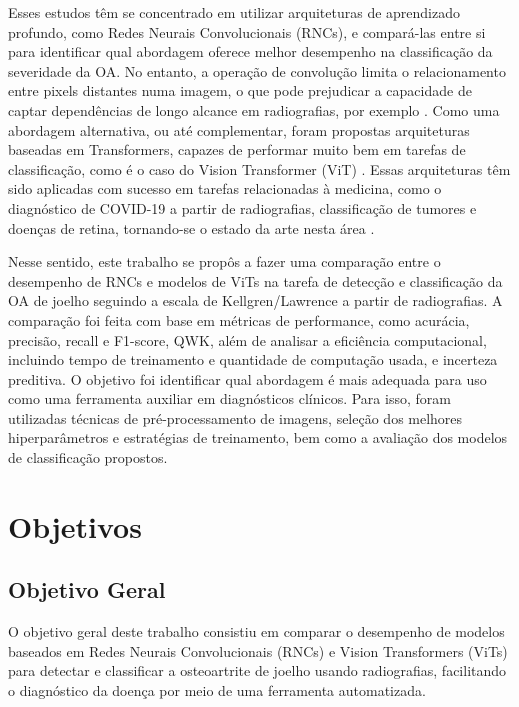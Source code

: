 Esses estudos têm se concentrado em utilizar arquiteturas de aprendizado profundo, como Redes Neurais Convolucionais (RNCs), e compará-las entre si para identificar qual abordagem oferece melhor desempenho na classificação da severidade da OA. No entanto, a operação de convolução limita o relacionamento entre pixels distantes numa imagem, o que pode prejudicar a capacidade de captar dependências de longo alcance em radiografias, por exemplo \citep{Shamshad2023}. Como uma abordagem alternativa, ou até complementar, foram propostas arquiteturas baseadas em Transformers, capazes de performar muito bem em tarefas de classificação, como é o caso do Vision Transformer (ViT) \citep{Dosovitskiy2021}. Essas arquiteturas têm sido aplicadas com sucesso em tarefas relacionadas à medicina, como o diagnóstico de COVID-19 a partir de radiografias, classificação de tumores e doenças de retina, tornando-se o estado da arte nesta área \citep{Shamshad2023}.

Nesse sentido, este trabalho se propôs a fazer uma comparação entre o desempenho de RNCs e modelos de ViTs na tarefa de detecção e classificação da OA de joelho seguindo a escala de Kellgren/Lawrence a partir de radiografias. A comparação foi feita com base em métricas de performance, como acurácia, precisão, recall e F1-score, QWK, além de analisar a eficiência computacional, incluindo tempo de treinamento e quantidade de computação usada, e incerteza preditiva. O objetivo foi identificar qual abordagem é mais adequada para uso como uma ferramenta auxiliar em diagnósticos clínicos. Para isso, foram utilizadas técnicas de pré-processamento de imagens, seleção dos melhores hiperparâmetros e estratégias de treinamento, bem como a avaliação dos modelos de classificação propostos.

\section{Objetivos}

\subsection{Objetivo Geral}

O objetivo geral deste trabalho consistiu em comparar o desempenho de modelos baseados em Redes Neurais Convolucionais (RNCs) e Vision Transformers (ViTs) para detectar e classificar a osteoartrite de joelho usando radiografias, facilitando o diagnóstico da doença por meio de uma ferramenta automatizada.

